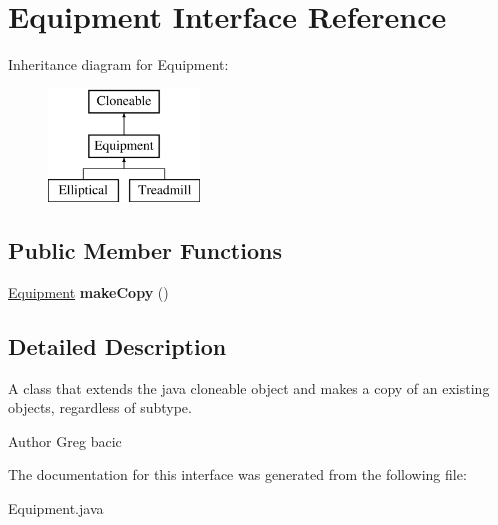 \hypertarget{interface_equipment}{}\section{Equipment Interface Reference}
\label{interface_equipment}
Inheritance diagram for Equipment\+:\begin{figure}[H]
\begin{center}
\leavevmode
\includegraphics[height=3.000000cm]{interface_equipment}
\end{center}
\end{figure}
\subsection*{Public Member Functions}
\begin{DoxyCompactItemize}
\item 
\hypertarget{interface_equipment_aec219eb46c6185f11c174c95a582f2eb}{}\hyperlink{interface_equipment}{Equipment} {\bfseries make\+Copy} ()\label{interface_equipment_aec219eb46c6185f11c174c95a582f2eb}

\end{DoxyCompactItemize}


\subsection{Detailed Description}
A class that extends the java cloneable object and makes a copy of an existing objects, regardless of subtype. \begin{DoxyAuthor}{Author}
Greg bacic 
\end{DoxyAuthor}


The documentation for this interface was generated from the following file\+:\begin{DoxyCompactItemize}
\item 
Equipment.\+java\end{DoxyCompactItemize}
